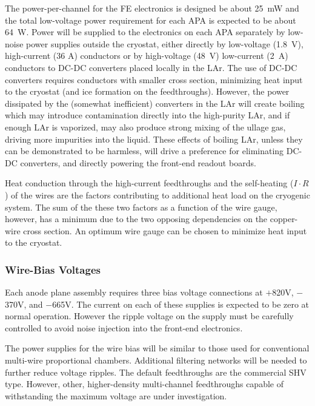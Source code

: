 The power-per-channel for the FE electronics is designed be about 25~mW and the total low-voltage
power requirement for each APA is expected to be about 64~W.
Power will be supplied to the electronics on each APA separately by low-noise
power supplies outside the cryostat, either directly by
low-voltage (1.8~V), high-current (36 A) conductors or by high-voltage (48~V)
low-current (2~A) conductors to DC-DC converters placed locally in the LAr.
The use of DC-DC converters requires conductors with smaller cross section,
minimizing heat input to the cryostat (and ice formation on the feedthroughs).
However, the power dissipated by the (somewhat inefficient) converters in
the LAr will create boiling which may introduce contamination directly into the 
high-purity LAr, and if enough LAr is vaporized, may also produce strong mixing of the
ullage gas, driving more impurities into the liquid.
These effects of boiling LAr, unless they can be demonstrated to be harmless,
will drive a preference for eliminating DC-DC converters, and directly powering the front-end readout boards.

Heat conduction through the high-current feedthroughs and the self-heating ($I\cdot R$) of the wires are the factors
contributing to additional heat load on the cryogenic system.
The sum of the these two factors as a function of the wire gauge, however, has a minimum 
due to the two opposing dependencies on the copper-wire cross section.
An optimum wire gauge can be chosen to minimize heat input to the cryostat.
%
\subsubsection{Wire-Bias Voltages}
\label{subsubsec:ce_feedthrough_wirebias}

Each anode plane assembly requires three bias voltage connections 
at $+$820V, $-$370V, and $-$665V.
The current on each of these supplies is expected to be zero at normal operation.
However the ripple voltage on the supply must be carefully controlled 
to avoid noise injection into the front-end electronics.  

The power supplies for the wire bias will be similar to 
those used for conventional multi-wire proportional chambers. 
Additional filtering networks will 
be needed to further reduce voltage ripples.  
The default feedthroughs are the commercial SHV type.  
However,  other, higher-density multi-channel 
feedthroughs capable of withstanding the maximum voltage are under investigation.  

